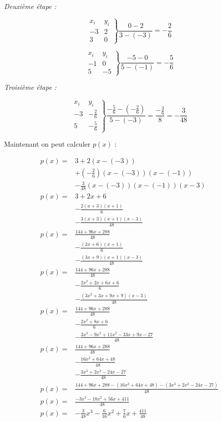 \documentclass[12pt, letterpaper]{article}
\begin{document}
\textit{Deuxième étape :}

$$
\left.
\begin{array}{ll}
  x_i & y_i \\
  -3 & 2 \\
  3 & 0
\end{array}
\right\}
\frac{0 - 2}{3 -(- 3)} = -\frac{2}{6}
$$

$$
\left.
\begin{array}{ll}
  x_i & y_i \\
  -1 & 0 \\
  5 & -5
\end{array}
\right\}
\frac{-5 - 0}{5 -(- 1)} = -\frac{5}{6}
$$

\textit{Troisième étape :}

$$
\left.
\begin{array}{ll}
  x_i & y_i \\
  -3 & -\frac{2}{6} \\
  5 & -\frac{5}{6}
\end{array}
\right\}
\frac{-\frac{5}{6} - (-\frac{2}{6})}{5 -(- 3)} =
\frac{-\frac{3}{6}}{8} = -\frac{3}{48}
$$

Maintenant on peut calculer $p(x)$ :

\begin{equation*}
\begin{split}
  p(x) = & 3 + 2(x - (-3)) \\
         & + (-\frac{2}{6})(x - (-3))(x - (-1)) \\
         & -\frac{3}{48}(x - (-3))(x - (-1))(x - 3) \\
  p(x) = & 3 + 2x + 6 \\
         & -\frac{2(x + 3)(x + 1)}{6} \\
         & -\frac{3(x + 3)(x + 1)(x - 3)}{48} \\
  p(x) = & \frac{144 + 96x + 288}{48} \\
         & -\frac{(2x + 6)(x + 1)}{6} \\
         & -\frac{(3x + 9)(x + 1)(x - 3)}{48} \\
  p(x) = & \frac{144 + 96x + 288}{48} \\
         & -\frac{2x^2 + 2x + 6x + 6}{6} \\
         & -\frac{(3x^2 + 3x + 9x + 9)(x - 3)}{48} \\
  p(x) = & \frac{144 + 96x + 288}{48} \\
         & -\frac{2x^2 + 8x + 6}{6} \\
         & -\frac{3x^3 - 9x^2 + 11x^2 - 33x + 9x - 27}{48} \\
  p(x) = & \frac{144 + 96x + 288}{48} \\
         & -\frac{16x^2 + 64x + 48}{48} \\
         & -\frac{3x^3 + 2x^2 - 24x - 27}{48} \\
  p(x) = & \frac{144 + 96x + 288 - (16x^2 + 64x + 48) - (3x^3 + 2x^2 -
    24x - 27)}{48} \\
  p(x) = &  \frac{-3x^3 - 18x^2 + 56x + 411}{48} \\
  p(x) = & -\frac{3}{48}x^3 - \frac{6}{16}x^2 + \frac{7}{6}x +
  \frac{411}{48}
\end{split}
\end{equation*}
\end{document}
